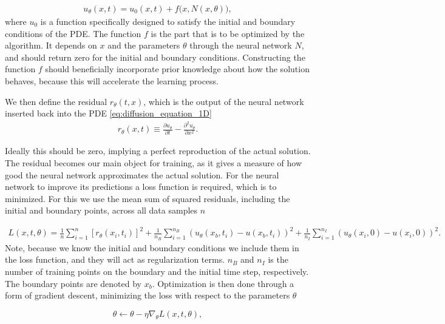 \documentclass[12pt]{extarticle}
\begin{document}
\begin{align}
	u_{\theta}(x,t) = u_0(x, t) + f\big(x, N(x,\theta)\big),
	\label{eq:NN_model}
\end{align}
where $u_0$ is a function specifically designed to satisfy the initial and boundary conditions of the PDE. The function $f$ is the part that is to be optimized by the algorithm. It depends on $x$ and the parameters $\theta$ through the neural network $N$, and should return zero for the initial and boundary conditions. Constructing the function $f$ should beneficially incorporate prior knowledge about how the solution behaves, because this will accelerate the learning process.

\par We then define the residual $r_\theta(t, x)$, which is the output of the neural network inserted back into the PDE \eqref{eq:diffusion_equation_1D}
\begin{align}
	r_\theta(x, t) \equiv \frac{\partial u_\theta}{\partial t} - \frac{\partial^2 u_\theta}{\partial x^2}.
	\label{eq:residual}
\end{align}

Ideally this should be zero, implying a perfect reproduction of the actual solution. The residual becomes our main object for training, as it gives a measure of how good the neural network approximates the actual solution. For the neural network to improve its predictions a loss function is required, which is to minimized. For this we use the mean sum of squared residuals, including the initial and boundary points, across all data samples $n$ 

\begin{align}
	L(x, t, \theta) = \frac{1}{n} \sum_{i=1}^n [r_\theta(x_i,t_i)]^2 + \frac{1}{n_B}\sum_{i=1}^{n_B} (u_{\theta}(x_b,t_i) - u(x_b,t_i))^2 + \frac{1}{n_I} \sum_{i=1}^{n_I} (u_{\theta}(x_i,0) - u(x_i,0))^2.
	\label{eq:NN_loss}
\end{align}
Note, because we know the initial and boundary conditions we include them in the loss function, and they will act as regularization terms. $n_B$ and $n_I$ is the number of training points on the boundary and the initial time step, respectively. The boundary points are denoted by $x_b$.
Optimization is then done through a form of gradient descent, minimizing the loss with respect to the parameters $\theta$

\begin{equation}
	\theta \leftarrow \theta - \eta \nabla_{\theta}L(x,t,\theta),
\end{equation}
\end{document}

